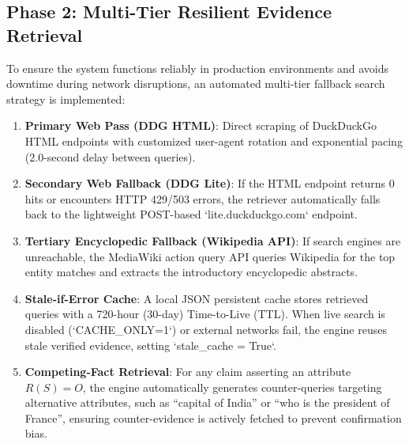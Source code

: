 \documentclass[12pt,a4paper]{report}
\begin{document}
\subsection{Phase 2: Multi-Tier Resilient Evidence Retrieval}
To ensure the system functions reliably in production environments and avoids downtime during network disruptions, an automated multi-tier fallback search strategy is implemented:
\begin{enumerate}
    \item \textbf{Primary Web Pass (DDG HTML)}: Direct scraping of DuckDuckGo HTML endpoints with customized user-agent rotation and exponential pacing (2.0-second delay between queries).
    \item \textbf{Secondary Web Fallback (DDG Lite)}: If the HTML endpoint returns 0 hits or encounters HTTP 429/503 errors, the retriever automatically falls back to the lightweight POST-based `lite.duckduckgo.com` endpoint.
    \item \textbf{Tertiary Encyclopedic Fallback (Wikipedia API)}: If search engines are unreachable, the MediaWiki action query API queries Wikipedia for the top entity matches and extracts the introductory encyclopedic abstracts.
    \item \textbf{Stale-if-Error Cache}: A local JSON persistent cache stores retrieved queries with a 720-hour (30-day) Time-to-Live (TTL). When live search is disabled (`CACHE\_ONLY=1`) or external networks fail, the engine reuses stale verified evidence, setting `stale\_cache = True`.
    \item \textbf{Competing-Fact Retrieval}: For any claim asserting an attribute $R(S) = O$, the engine automatically generates counter-queries targeting alternative attributes, such as ``capital of India'' or ``who is the president of France'', ensuring counter-evidence is actively fetched to prevent confirmation bias.
\end{enumerate}
\end{document}
